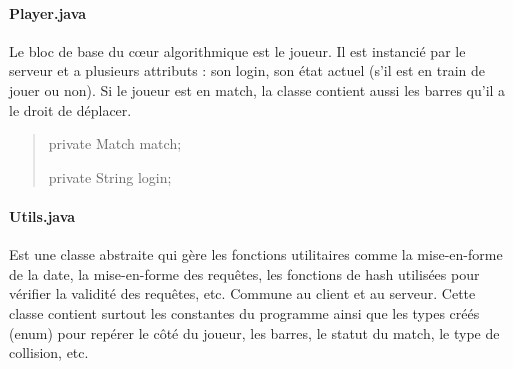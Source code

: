 \documentclass[a4paper,12pt]{report}
\begin{document}
\paragraph{Player.java}
Le bloc de base du c\oe{}ur algorithmique est le joueur. Il est instancié par le serveur et a plusieurs attributs : son login, son état actuel (s'il est en train de jouer ou non). Si le joueur est en match, la classe contient aussi les barres qu'il a le droit de déplacer.
\begin{quote}
	private Match match;
    
	private String login;
\end{quote}
\paragraph{Utils.java}
Est une classe abstraite qui gère les fonctions utilitaires comme la mise-en-forme de la date, la mise-en-forme des requêtes, les fonctions de hash utilisées pour vérifier la validité des requêtes, etc. Commune au client et au serveur. Cette classe contient surtout les constantes du programme ainsi que les types créés (enum) pour repérer le côté du joueur, les barres, le statut du match, le type de collision, etc.
\end{document}
